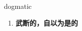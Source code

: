 
\begin{frame}
{\huge dogmatic}
\begin{center}
\begin{enumerate}\Large
  \item \textbf{武断的，自以为是的}
\end{enumerate}
\end{center}
\end{frame}
